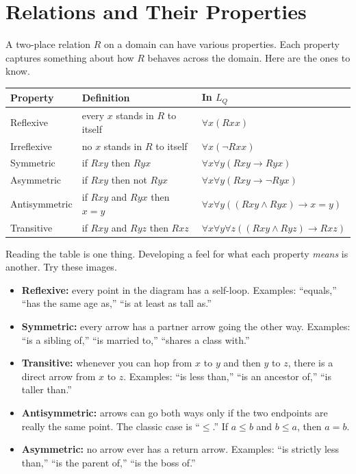 \documentclass[11pt]{article}
\begin{document}
\section{Relations and Their Properties}

A two-place relation $R$ on a domain can have various properties. Each property captures something about how $R$ behaves across the domain. Here are the ones to know.

\begin{center}
\begin{tabular}{|l|l|l|}
\hline
\textbf{Property} & \textbf{Definition} & \textbf{In $L_Q$}\\
\hline
Reflexive & every $x$ stands in $R$ to itself & $\forall x(Rxx)$\\
Irreflexive & no $x$ stands in $R$ to itself & $\forall x(\neg Rxx)$\\
Symmetric & if $Rxy$ then $Ryx$ & $\forall x \forall y(Rxy \to Ryx)$\\
Asymmetric & if $Rxy$ then not $Ryx$ & $\forall x \forall y(Rxy \to \neg Ryx)$\\
Antisymmetric & if $Rxy$ and $Ryx$ then $x = y$ & $\forall x \forall y((Rxy \wedge Ryx) \to x = y)$\\
Transitive & if $Rxy$ and $Ryz$ then $Rxz$ & $\forall x \forall y \forall z((Rxy \wedge Ryz) \to Rxz)$\\
\hline
\end{tabular}
\end{center}

Reading the table is one thing. Developing a feel for what each property \emph{means} is another. Try these images.

\begin{itemize}[leftmargin=*]
    \item \textbf{Reflexive:} every point in the diagram has a self-loop. Examples: ``equals,'' ``has the same age as,'' ``is at least as tall as.''
    \item \textbf{Symmetric:} every arrow has a partner arrow going the other way. Examples: ``is a sibling of,'' ``is married to,'' ``shares a class with.''
    \item \textbf{Transitive:} whenever you can hop from $x$ to $y$ and then $y$ to $z$, there is a direct arrow from $x$ to $z$. Examples: ``is less than,'' ``is an ancestor of,'' ``is taller than.''
    \item \textbf{Antisymmetric:} arrows can go both ways only if the two endpoints are really the same point. The classic case is ``$\leq$.'' If $a \leq b$ and $b \leq a$, then $a = b$.
    \item \textbf{Asymmetric:} no arrow ever has a return arrow. Examples: ``is strictly less than,'' ``is the parent of,'' ``is the boss of.''
\end{itemize}
\end{document}
